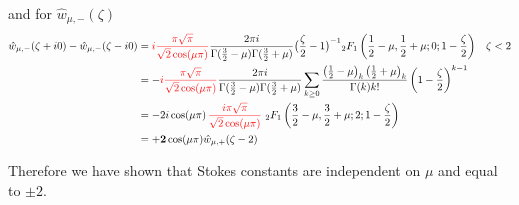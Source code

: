 \documentclass{article}
\begin{document}
and for $\hat{w}_{\mu,-}(\zeta)$
\begin{align*}
\hat{w}_{\mu,-}(\zeta+i0)-\hat{w}_{\mu,-}(\zeta-i0)&=\textcolor{red}{i\frac{\pi\sqrt{\pi}}{\sqrt{2}\cos(\mu \pi)}}\frac{2\pi i}{\Gamma(\tfrac{3}{2}-\mu)\Gamma(\tfrac{3}{2}+\mu)}\big(\frac{\zeta}{2}-1\big)^{-1}{}_2F_1\left(\frac{1}{2}-\mu,\frac{1}{2}+\mu;0;1-\frac{\zeta}{2}\right) & \zeta<2 \\
&=-\textcolor{red}{i\frac{\pi\sqrt{\pi}}{\sqrt{2}\cos(\mu \pi)}}\frac{2\pi i}{\Gamma(\tfrac{3}{2}-\mu)\Gamma(\tfrac{3}{2}+\mu)}\sum_{k\geq 0}\frac{\left(\tfrac{1}{2}-\mu\right)_k\left(\tfrac{1}{2}+\mu\right)_k}{\Gamma(k)k!}\left(1-\frac{\zeta}{2}\right)^{k-1} & \\
&=-2i\cos(\mu \pi)\,\textcolor{red}{\frac{i\pi\sqrt{\pi}}{\sqrt{2}\cos(\mu \pi)}}\,\, {}_2F_1\left(\frac{3}{2}-\mu,\frac{3}{2}+\mu;2;1-\frac{\zeta}{2}\right) & \\
&=\mathbf{+2}\cos(\mu \pi)\hat{w}_{\mu,+}(\zeta-2)
\end{align*}

Therefore we have shown that Stokes constants are independent on $\mu$ and equal to $\pm 2$.







\end{document}
